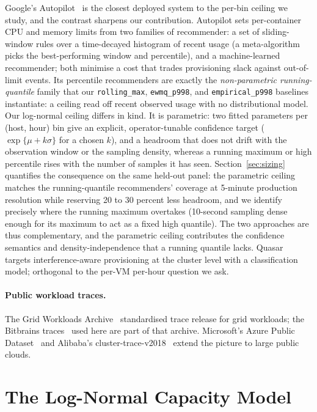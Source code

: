 \documentclass[11pt,a4paper]{article}
\begin{document}
Google's Autopilot~\cite{rzadca2020autopilot} is the closest deployed
system to the per-bin ceiling we study, and the contrast sharpens our
contribution. Autopilot sets per-container CPU and memory limits from two
families of recommender: a set of sliding-window rules over a
time-decayed histogram of recent usage (a meta-algorithm picks the
best-performing window and percentile), and a machine-learned
recommender; both minimise a cost that trades provisioning slack against
out-of-limit events. Its percentile recommenders are exactly the
\emph{non-parametric running-quantile} family that our
\texttt{rolling\_max}, \texttt{ewmq\_p998}, and \texttt{empirical\_p998}
baselines instantiate: a ceiling read off recent observed usage with no
distributional model. Our log-normal ceiling differs in kind. It is
parametric: two fitted parameters per (host, hour) bin give an explicit,
operator-tunable confidence target ($\exp\{\mu + k\sigma\}$ for a chosen
$k$), and a headroom that does not drift with the observation window or
the sampling density, whereas a running maximum or high percentile rises
with the number of samples it has seen. Section~\ref{sec:sizing}
quantifies the consequence on the same held-out panel: the parametric
ceiling matches the running-quantile recommenders' coverage at
5-minute production resolution while reserving 20 to 30 percent less
headroom, and we identify precisely where the running maximum overtakes
(10-second sampling dense enough for its maximum to act as a fixed high
quantile). The two approaches are thus complementary, and the parametric
ceiling contributes the confidence semantics and density-independence
that a running quantile lacks. Quasar~\cite{delimitrou2014quasar}
targets interference-aware provisioning at the cluster level with a
classification model; orthogonal to the per-VM per-hour question we ask.

\paragraph{Public workload traces.}
The Grid Workloads Archive~\cite{iosup2008gwa} standardised trace release for
grid workloads; the Bitbrains traces~\cite{shen2015bitbrains} used here are
part of that archive. Microsoft's Azure Public
Dataset~\cite{cortez2017resource} and Alibaba's
cluster-trace-v2018~\cite{alibaba2018trace} extend the picture to large
public clouds.

\section{The Log-Normal Capacity Model}
\label{sec:model}
\end{document}
